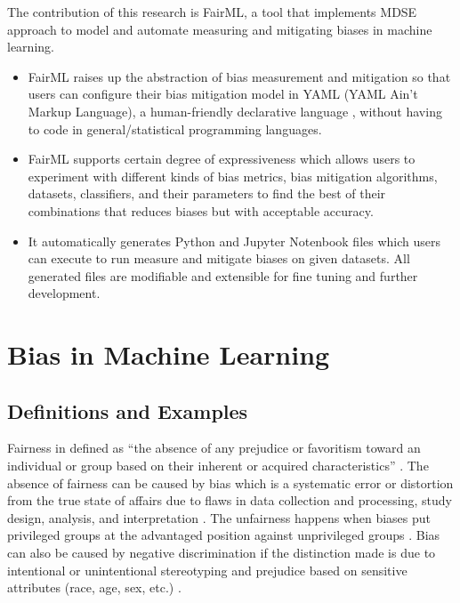 \documentclass[final,5p,times,twocolumn]{elsarticle}
\begin{document}
The contribution of this research is FairML, a tool that implements MDSE approach to model and automate measuring and mitigating biases in machine learning. 
\begin{itemize}
\item FairML raises up the abstraction of bias measurement and mitigation so that users can configure their bias mitigation model in YAML (YAML Ain’t Markup Language), a human-friendly declarative language \cite{evans2017yaml}, without having to code in general/statistical programming languages.
\item FairML supports certain degree of expressiveness which allows users to experiment with different kinds of bias metrics, bias mitigation algorithms, datasets, classifiers, and their parameters to find the best of their combinations that reduces biases but with acceptable accuracy.
\item It automatically generates Python and Jupyter Notenbook files which users can execute to run measure and mitigate biases on given datasets. All generated files are modifiable and extensible for fine tuning and further development.
\end{itemize}



\section{Bias in Machine Learning}
\label{sec:bias_in_machine_learning}

\subsection{Definitions and Examples}
\label{sec:definitions_and_examples}

Fairness in defined as ``the absence of any prejudice or favoritism toward an individual or
group based on their inherent or acquired characteristics'' \cite{mehrabi2021survey}.
The absence of fairness can be caused by bias which is a systematic error or distortion from the true state of affairs due to flaws in data collection and processing, study design, analysis, and interpretation \cite{oxford2022bias}. 
The unfairness happens when biases put privileged groups at the advantaged position against unprivileged groups \cite{bellamy2018ai}. 
Bias can also be caused by negative discrimination if the distinction made is due to intentional or unintentional stereotyping and prejudice based on sensitive attributes (race, age, sex, etc.) \cite{mehrabi2021survey,chen2019fairness}. 
\end{document}
